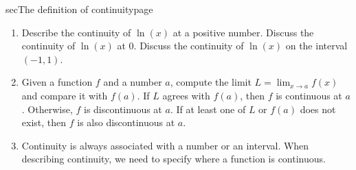 \documentclass[../main]{subfiles}
\begin{document}
\begin{outline}{sec}{The definition of continuity}{page}
\begin{enumerate}
    \item Describe the continuity of \(\ln(x)\) at a positive number. Discuss the continuity of \(\ln(x)\) at \(0\).
          Discuss the continuity of \(\ln(x)\) on the interval \((-1,1)\).
    \item {Given a function \(f\) and a number \(a\), compute the limit \(L = \lim_{x \to a} f(x)\) and compare it with \(f(a)\). If \(L\) agrees with \(f(a)\), then \(f\) is continuous at \(a\). Otherwise, \(f\) is discontinuous at \(a\). If at least one of \(L\) or \(f(a)\) does not exist, then \(f\) is also discontinuous at \(a\).}

    \item {Continuity is always associated with a number or an interval. When describing continuity, we need to specify where a function is continuous.}
  \end{enumerate}
\end{outline}
\end{document}
